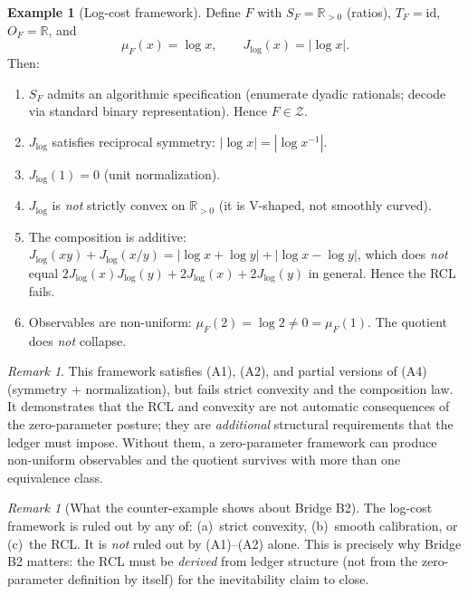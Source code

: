 \documentclass[11pt]{article}
\newcommand{\R}{\mathbb{R}}
\newcommand{\Rp}{\mathbb{R}_{>0}}
\newcommand{\cZ}{\mathcal{Z}}
\theoremstyle{definition}
\newtheorem{example}[theorem]{Example}
\theoremstyle{remark}
\newtheorem{remark}[theorem]{Remark}
\begin{document}
\begin{example}[Log-cost framework]\label{ex:logcost}
Define $F$ with $S_F = \Rp$ (ratios), $T_F = \mathrm{id}$,
$O_F = \R$, and
\[
\mu_F(x) = \log x, \qquad J_{\log}(x) = |\log x|.
\]
Then:
\begin{enumerate}
\item $S_F$ admits an algorithmic specification
  (enumerate dyadic rationals; decode via standard binary
  representation).
  Hence $F \in \cZ$.
\item $J_{\log}$ satisfies reciprocal symmetry:
  $|\log x| = |\log x^{-1}|$.
\item $J_{\log}(1) = 0$ (unit normalization).
\item $J_{\log}$ is \emph{not} strictly convex on $\Rp$
  (it is V-shaped, not smoothly curved).
\item The composition is additive:
  $J_{\log}(xy) + J_{\log}(x/y) = |\log x + \log y| +
  |\log x - \log y|$, which does \emph{not} equal
  $2J_{\log}(x)J_{\log}(y) + 2J_{\log}(x) + 2J_{\log}(y)$
  in general.
  Hence the RCL fails.
\item Observables are non-uniform: $\mu_F(2) = \log 2 \neq 0 =
  \mu_F(1)$.
  The quotient does \emph{not} collapse.
\end{enumerate}
\end{example}

\begin{remark}
This framework satisfies (A1), (A2), and partial versions of
(A4) (symmetry + normalization), but fails strict convexity and
the composition law.
It demonstrates that the RCL and convexity are not automatic
consequences of the zero-parameter posture; they are
\emph{additional} structural requirements that the ledger must
impose.
Without them, a zero-parameter framework can produce
non-uniform observables and the quotient survives with more
than one equivalence class.
\end{remark}

\begin{remark}[What the counter-example shows about Bridge B2]
The log-cost framework is ruled out by any of: (a)~strict
convexity, (b)~smooth calibration, or (c)~the RCL.
It is \emph{not} ruled out by (A1)--(A2) alone.
This is precisely why Bridge B2 matters: the RCL must be
\emph{derived} from ledger structure (not from the zero-parameter
definition by itself) for the inevitability claim to close.
\end{remark}
\end{document}
